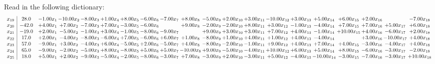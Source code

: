 \documentclass[9pt]{article}
\begin{document}
Read in the following dictionary:
\[\begin{array}{c| c c@{\hskip 2pt} c@{\hskip 2pt} c@{\hskip 2pt} c@{\hskip 2pt} c@{\hskip 2pt} c@{\hskip 2pt} c@{\hskip 2pt} c@{\hskip 2pt} c@{\hskip 2pt} c@{\hskip 2pt} c@{\hskip 2pt} c@{\hskip 2pt} c@{\hskip 2pt} c@{\hskip 2pt} c@{\hskip 2pt} c@{\hskip 2pt} c@{\hskip 2pt} c@{\hskip 2pt} }
 x_{19}   &  28.0 & -1.00 x_{1} & -10.00 x_{2} & -8.00 x_{3} & +  1.00 x_{4} & +  8.00 x_{5} & -6.00 x_{6} & -7.00 x_{7} & +  8.00 x_{8} & -5.00 x_{9} & +  2.00 x_{10} & +  3.00 x_{11} & -10.00 x_{12} & +  3.00 x_{13} & +  5.00 x_{14} & +  6.00 x_{15} & +  2.00 x_{16} &   & -7.00 x_{18}\\
 x_{20}   &  -42.0 & +  4.00 x_{1} & +  7.00 x_{2} & -7.00 x_{3} & +  7.00 x_{4} & -3.00 x_{5} & -6.00 x_{6} &   & +  9.00 x_{8} & -2.00 x_{9} & -2.00 x_{10} & +  8.00 x_{11} & +  3.00 x_{12} & -1.00 x_{13} & -4.00 x_{14} & +  7.00 x_{15} & +  7.00 x_{16} & +  5.00 x_{17} & +  6.00 x_{18}\\
 x_{21}   &  -19.0 & +  2.00 x_{1} & -5.00 x_{2} & -1.00 x_{3} & +  3.00 x_{4} & -1.00 x_{5} & -8.00 x_{6} & -9.00 x_{7} &   & +  9.00 x_{9} & +  3.00 x_{10} & +  3.00 x_{11} & +  7.00 x_{12} & +  4.00 x_{13} & -1.00 x_{14} & + 10.00 x_{15} & +  4.00 x_{16} & -6.00 x_{17} & +  2.00 x_{18}\\
 x_{22}   &  17.0 & +  2.00 x_{1} & -4.00 x_{2} & -8.00 x_{3} & -6.00 x_{4} & +  7.00 x_{5} & -6.00 x_{6} & +  6.00 x_{7} & +  1.00 x_{8} & -8.00 x_{9} & +  1.00 x_{10} & +  4.00 x_{11} & +  1.00 x_{12} & +  4.00 x_{13} & -4.00 x_{14} &   & +  3.00 x_{16} & -10.00 x_{17} & +  4.00 x_{18}\\
 x_{23}   &  57.0 & -9.00 x_{1} & +  3.00 x_{2} & -4.00 x_{3} & +  6.00 x_{4} & -5.00 x_{5} & +  2.00 x_{6} & -5.00 x_{7} & +  4.00 x_{8} & -8.00 x_{9} & -2.00 x_{10} & -1.00 x_{11} & +  9.00 x_{12} & +  4.00 x_{13} & +  7.00 x_{14} & +  4.00 x_{15} & -3.00 x_{16} & -4.00 x_{17} & +  4.00 x_{18}\\
 x_{24}   &  65.0 & -9.00 x_{1} & -2.00 x_{2} & -5.00 x_{3} & +  8.00 x_{4} & -8.00 x_{5} & +  5.00 x_{6} & +  5.00 x_{7} & -10.00 x_{8} & +  9.00 x_{9} & -5.00 x_{10} & -4.00 x_{11} & + 10.00 x_{12} & +  6.00 x_{13} & +  5.00 x_{14} & +  8.00 x_{15} & -6.00 x_{16} & -3.00 x_{17} & -2.00 x_{18}\\
 x_{25}   &  18.0 & +  5.00 x_{1} & +  2.00 x_{2} & -9.00 x_{3} & -5.00 x_{4} & -2.00 x_{5} & -8.00 x_{6} & -3.00 x_{7} & +  7.00 x_{8} & -3.00 x_{9} & +  2.00 x_{10} & -3.00 x_{11} & +  5.00 x_{12} & -4.00 x_{13} & -10.00 x_{14} & -3.00 x_{15} & -7.00 x_{16} & -3.00 x_{17} & + 10.00 x_{18}\\

\end{array}\]
\end{document}
